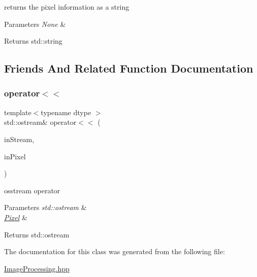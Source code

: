returns the pixel information as a string


\begin{DoxyParams}{Parameters}
{\em None} & \\
\hline
\end{DoxyParams}
\begin{DoxyReturn}{Returns}
std\+::string 
\end{DoxyReturn}


\subsection{Friends And Related Function Documentation}
\mbox{\label{class_num_cpp_1_1_image_processing_1_1_pixel_ab2651c4b29062ba3676ace1dde6ad93d}} 
\subsubsection{\texorpdfstring{operator$<$$<$}{operator<<}}
{\footnotesize\ttfamily template$<$typename dtype $>$ \\
std\+::ostream\& operator$<$$<$ (\begin{DoxyParamCaption}\item[{std\+::ostream \&}]{in\+Stream,  }\item[{const \mbox{\hyperlink{class_num_cpp_1_1_image_processing_1_1_pixel}{Pixel}} \&}]{in\+Pixel }\end{DoxyParamCaption})\hspace{0.3cm}{\ttfamily [friend]}}

osstream operator


\begin{DoxyParams}{Parameters}
{\em std\+::ostream} & \\
\hline
{\em \mbox{\hyperlink{class_num_cpp_1_1_image_processing_1_1_pixel}{Pixel}}} & \\
\hline
\end{DoxyParams}
\begin{DoxyReturn}{Returns}
std\+::ostream 
\end{DoxyReturn}


The documentation for this class was generated from the following file\+:\begin{DoxyCompactItemize}
\item 
\mbox{\hyperlink{_image_processing_8hpp}{Image\+Processing.\+hpp}}\end{DoxyCompactItemize}
